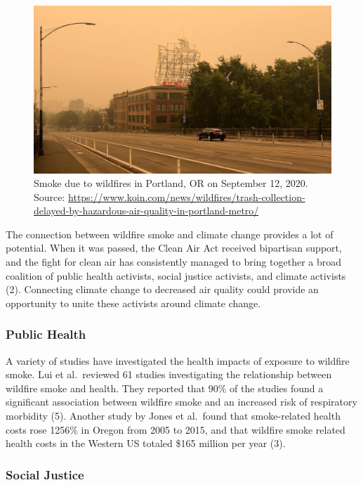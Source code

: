 \documentclass[]{article}
\begin{document}
\begin{figure}
\centering
\includegraphics{AP20257021718485.jpg}
\caption{Smoke due to wildfires in Portland, OR on September 12, 2020.
Source:
\url{https://www.koin.com/news/wildfires/trash-collection-delayed-by-hazardous-air-quality-in-portland-metro/}}
\end{figure}

The connection between wildfire smoke and climate change provides a lot
of potential. When it was passed, the Clean Air Act received bipartisan
support, and the fight for clean air has consistently managed to bring
together a broad coalition of public health activists, social justice
activists, and climate activists (2). Connecting climate change to
decreased air quality could provide an opportunity to unite these
activists around climate change.

\hypertarget{public-health}{%
\subsubsection{Public Health}\label{public-health}}

A variety of studies have investigated the health impacts of exposure to
wildfire smoke. Lui et al.~reviewed 61 studies investigating the
relationship between wildfire smoke and health. They reported that 90\%
of the studies found a significant association between wildfire smoke
and an increased risk of respiratory morbidity (5). Another study by
Jones et al.~found that smoke-related health costs rose 1256\% in Oregon
from 2005 to 2015, and that wildfire smoke related health costs in the
Western US totaled \$165 million per year (3).

\hypertarget{social-justice}{%
\subsubsection{Social Justice}\label{social-justice}}
\end{document}
